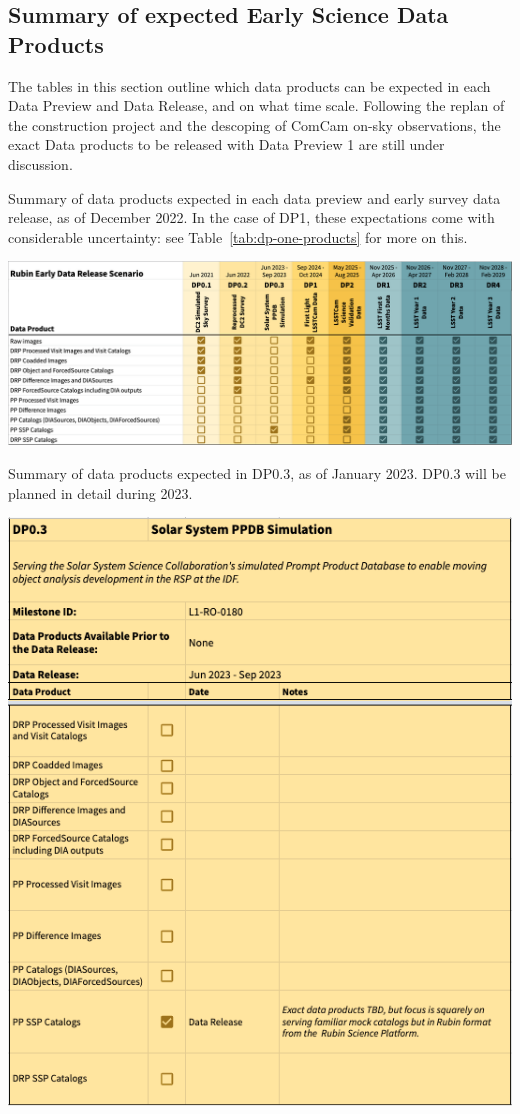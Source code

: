 \subsection{Summary of expected Early Science Data Products} \label{ssec:dataproductsummary}
The tables in this section outline which data products can be expected in each Data Preview and Data Release, and on what time scale.
Following the replan of the construction project and the descoping of ComCam on-sky observations, the exact Data products to be released with Data Preview 1 are still under discussion.

\begin{table}
\caption{Summary of data products expected in each data preview and early survey data release, as of December 2022.
In the case of DP1, these expectations come with considerable uncertainty: see Table~\ref{tab:dp-one-products} for more on this.}
\label{tab:summary}
\includegraphics[width=\linewidth]{figures/DPR-summary}
\end{table}

\begin{table}
\caption{Summary of data products expected in DP0.3, as of January 2023.
DP0.3 will be planned in detail during 2023.}
\label{tab:dp-zpthree-products}
\includegraphics[width=\linewidth]{figures/DP0.3-products}
\end{table}

